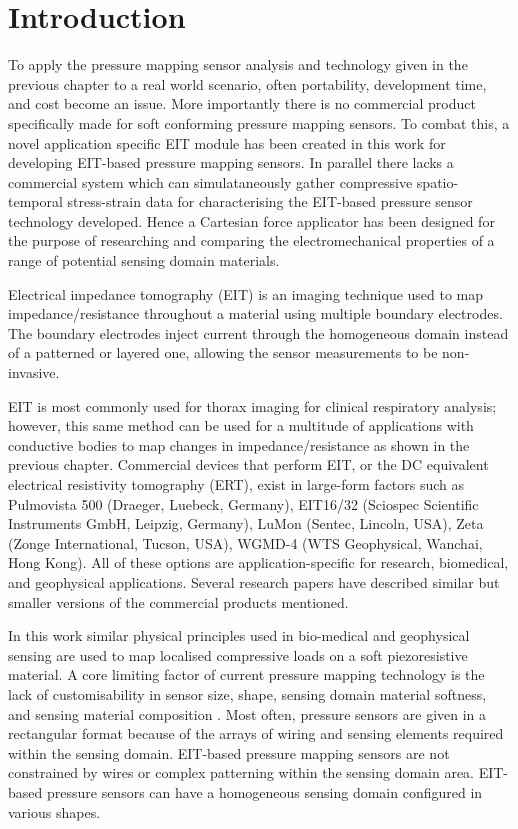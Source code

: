 \section{Introduction}
To apply the pressure mapping sensor analysis and technology given in the previous chapter to a real world scenario, often portability, development time, and cost become an issue. More importantly there is no commercial product specifically made for soft conforming pressure mapping sensors. To combat this, a novel application specific EIT module has been created in this work for developing EIT-based pressure mapping sensors. In parallel there lacks a commercial system which can simulataneously gather compressive spatio-temporal stress-strain data for characterising the EIT-based pressure sensor technology developed. Hence a Cartesian force applicator has been designed for the purpose of researching and comparing the electromechanical properties of a range of potential sensing domain materials. 

Electrical impedance tomography (EIT) is an imaging technique used to map impedance/resistance throughout a material using multiple boundary electrodes. The boundary electrodes inject current through the homogeneous domain instead of a patterned or layered one, allowing the sensor measurements to be non-invasive. 

EIT is most commonly used for thorax imaging for clinical respiratory analysis; however, this same method can be used for a multitude of applications with conductive bodies to map changes in impedance/resistance as shown in the previous chapter. Commercial devices that perform EIT, or the DC equivalent electrical resistivity tomography (ERT), exist in large-form factors such as Pulmovista 500 (Draeger, Luebeck, Germany), EIT16/32 (Sciospec Scientific Instruments GmbH, Leipzig, Germany), LuMon (Sentec, Lincoln, USA), Zeta (Zonge International, Tucson, USA), WGMD-4 (WTS Geophysical, Wanchai, Hong Kong). All of these options are application-specific for research, biomedical, and geophysical applications. Several research papers \cite{Chen2023,Hong2015,Lee2020,Li2023,Soleimani2006,Suh2022,Tiwari2022,Xu2022,Zhang2015,Zhang2016} have described similar but smaller versions of the commercial products mentioned.

In this work similar physical principles used in bio-medical and geophysical sensing are used to map localised compressive loads on a soft piezoresistive material. A core limiting factor of current pressure mapping technology is the lack of customisability in sensor size, shape, sensing domain material softness, and sensing material composition \cite{Gilanizadehdizaj2022,Rossiter2005,Liang2015,Fu2020}. Most often, pressure sensors are given in a rectangular format because of the arrays of wiring and sensing elements required within the sensing domain. EIT-based pressure mapping sensors are not constrained by wires or complex patterning within the sensing domain area. EIT-based pressure sensors can have a homogeneous sensing domain configured in various shapes. 

